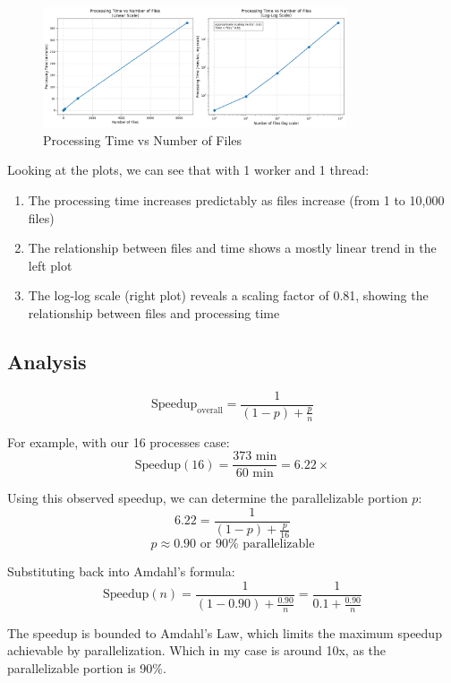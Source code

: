 \documentclass[11pt,a4paper]{article}
\begin{document}
\begin{figure}[H]
    \centering
    \includegraphics[width=0.8\textwidth]{runtime2.png}
    \caption{Processing Time vs Number of Files}
\end{figure}

Looking at the plots, we can see that with 1 worker and 1 thread:
\begin{enumerate}
    \item The processing time increases predictably as files increase (from 1 to 10,000 files)
    \item The relationship between files and time shows a mostly linear trend in the left plot
    \item The log-log scale (right plot) reveals a scaling factor of 0.81, showing the relationship between files and processing time
\end{enumerate}

\subsection{Analysis}

\[ \text{Speedup}_{\text{overall}} = \frac{1}{(1-p) + \frac{p}{n}} \]

For example, with our 16 processes case:
\[ \text{Speedup}(16) = \frac{373 \text{ min}}{60 \text{ min}} = 6.22\times \]

Using this observed speedup, we can determine the parallelizable portion $p$:
\[ 6.22 = \frac{1}{(1-p) + \frac{p}{16}} \]
\[ p \approx 0.90 \text{ or } 90\% \text{ parallelizable} \]

Substituting back into Amdahl's formula:
\[ \text{Speedup}(n) = \frac{1}{(1-0.90) + \frac{0.90}{n}} = \frac{1}{0.1 + \frac{0.90}{n}} \]


The speedup is bounded to Amdahl's Law, which limits the maximum speedup achievable by parallelization.
Which in my case is around 10x, as the parallelizable portion is 90\%.
\end{document}

